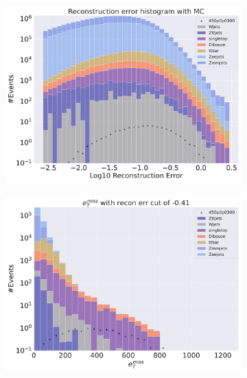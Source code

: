 \begin{figure}[H]
    \centering
    \begin{subfigure}{.40\textwidth}
        \includegraphics[width=\textwidth]{Figures/VAE_testing/small/2lep/b_data_recon_big_rm3_feats_sig_450p0p0300_.pdf}
        \caption{ }
        \label{fig:VAE_2lep_big_450_3}
    \end{subfigure}
    \hfill
    \begin{subfigure}{.40\textwidth}
        \includegraphics[width=\textwidth]{Figures/VAE_testing/big/2lep/b_data_recon_big_rm3_feats_sig_450p0p0300_recon_errcut_-0.41.pdf}
        \caption{}
        \label{fig:VAE_2lep_big_etmiss_450_3}
    \end{subfigure}

\end{figure}
